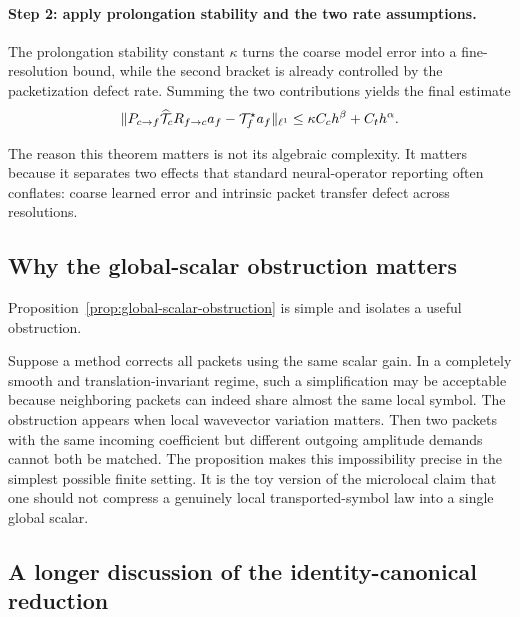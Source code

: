 \paragraph{Step 2: apply prolongation stability and the two rate assumptions.}
The prolongation stability constant $\kappa$ turns the coarse model error into a fine-resolution bound, while the second bracket is already controlled by the packetization defect rate. Summing the two contributions yields the final estimate
\[
\|P_{c\to f}\widehat{\mathcal T}_c R_{f\to c} a_f - \mathcal T^\star_f a_f\|_{\ell^1}
\le
\kappa C_c h^\beta + C_t h^\alpha.
\]

The reason this theorem matters is not its algebraic complexity. It matters because it separates two effects that standard neural-operator reporting often conflates: coarse learned error and intrinsic packet transfer defect across resolutions.

\subsection{Why the global-scalar obstruction matters}

Proposition~\ref{prop:global-scalar-obstruction} is simple and isolates a useful obstruction.

Suppose a method corrects all packets using the same scalar gain. In a completely smooth and translation-invariant regime, such a simplification may be acceptable because neighboring packets can indeed share almost the same local symbol. The obstruction appears when local wavevector variation matters. Then two packets with the same incoming coefficient but different outgoing amplitude demands cannot both be matched. The proposition makes this impossibility precise in the simplest possible finite setting. It is the toy version of the microlocal claim that one should not compress a genuinely local transported-symbol law into a single global scalar.

\subsection{A longer discussion of the identity-canonical reduction}

